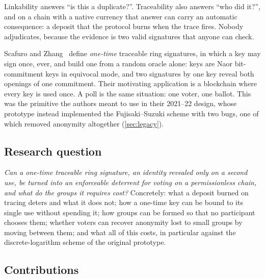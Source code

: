 \documentclass[11pt,a4paper]{article}
\theoremstyle{definition}
\begin{document}
Linkability answers ``is this a duplicate?''. Traceability also answers
``who did it?'', and on a chain with a native currency that answer can
carry an automatic consequence: a deposit that the protocol burns when
the trace fires. Nobody adjudicates, because the evidence is two valid
signatures that anyone can check.

Scafuro and Zhang~\cite{SZ21} define \emph{one-time} traceable ring
signatures, in which a key may sign once, ever, and build one from a
random oracle alone: keys are Naor bit-commitment keys in equivocal mode,
and two signatures by one key reveal both openings of one commitment.
Their motivating application is a blockchain where every key is used
once. A poll is the same situation: one voter, one ballot. This was the
primitive the authors meant to use in their 2021--22 design, whose
prototype instead implemented the Fujisaki--Suzuki scheme with two bugs,
one of which removed anonymity altogether (\cref{sec:legacy}).

\subsection{Research question}
\label{sec:rq}

\emph{Can a one-time traceable ring signature, an identity revealed only
on a second use, be turned into an enforceable deterrent for voting on a
permissionless chain, and what do the groups it requires cost?}
Concretely: what a deposit burned on tracing deters and what it does
not; how a one-time key can be bound to its single use without spending
it; how groups can be formed so that no participant chooses them;
whether voters can recover anonymity lost to small groups by moving
between them; and what all of this costs, in particular against the
discrete-logarithm scheme of the original prototype.

\subsection{Contributions}
\end{document}
